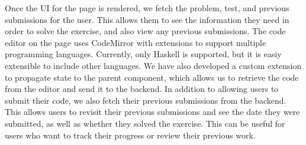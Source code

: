 Once the UI for the page is rendered, we fetch the problem, test, and previous submissions for the user.
This allows them to see the information they need in order to solve the exercise, and also view any previous submissions.
The code editor on the page uses CodeMirror with extensions to support multiple programming languages.
Currently, only Haskell is supported, but it is easiy extensible to include other languages.
We have also developed a custom extension to propagate state to the parent component, which allows us to retrieve the code from the editor and send it to the backend.
In addition to allowing users to submit their code, we also fetch their previous submissions from the backend.
This allows users to revisit their previous submissions and see the date they were submitted, as well as whether they solved the exercise.
This can be useful for users who want to track their progress or review their previous work.



